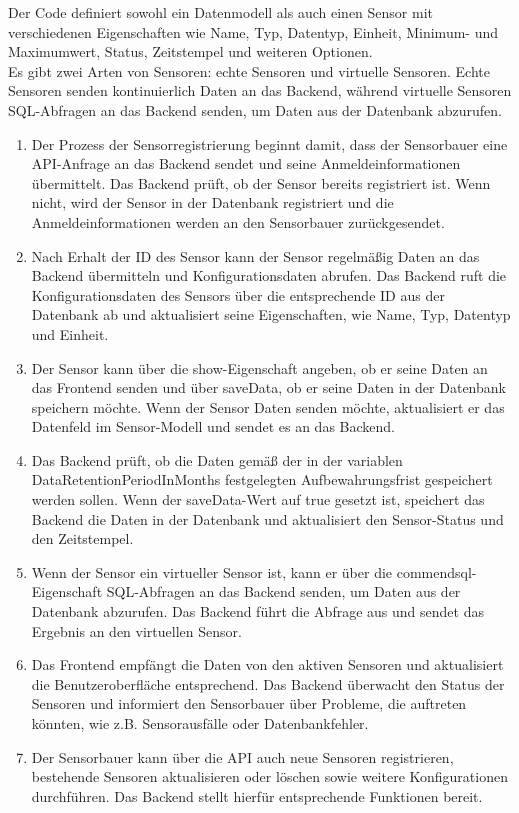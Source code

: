 \begin{flushleft}
Der Code definiert sowohl ein Datenmodell als auch einen Sensor mit verschiedenen Eigenschaften wie Name, Typ, Datentyp, Einheit, Minimum- und Maximumwert, Status, Zeitstempel und weiteren Optionen.\\
Es gibt zwei Arten von Sensoren: echte Sensoren und virtuelle Sensoren. Echte Sensoren senden kontinuierlich Daten an das Backend, während virtuelle Sensoren SQL-Abfragen an das Backend senden, um Daten aus der Datenbank abzurufen.
\\
\begin{enumerate}
	\item Der Prozess der Sensorregistrierung beginnt damit, dass der Sensorbauer eine API-Anfrage an das Backend sendet und seine Anmeldeinformationen übermittelt. Das Backend prüft, ob der Sensor bereits registriert ist. Wenn nicht, wird der Sensor in der Datenbank registriert und die Anmeldeinformationen werden an den Sensorbauer zurückgesendet.
	\item Nach Erhalt der ID des Sensor kann der Sensor regelmäßig Daten an das Backend übermitteln und Konfigurationsdaten abrufen. Das Backend ruft die Konfigurationsdaten des Sensors über die entsprechende ID aus der Datenbank ab und aktualisiert seine Eigenschaften, wie Name, Typ, Datentyp und Einheit.
	\item Der Sensor kann über die show-Eigenschaft angeben, ob er seine Daten an das Frontend senden und über saveData, ob er seine Daten in der Datenbank speichern möchte. Wenn der Sensor Daten senden möchte, aktualisiert er das Datenfeld im Sensor-Modell und sendet es an das Backend.
	\item Das Backend prüft, ob die Daten gemäß der in der variablen DataRetentionPeriodInMonths festgelegten Aufbewahrungsfrist gespeichert werden sollen. Wenn der saveData-Wert auf true gesetzt ist, speichert das Backend die Daten in der Datenbank und aktualisiert den Sensor-Status und den Zeitstempel.
	\item Wenn der Sensor ein virtueller Sensor ist, kann er über die commendsql-Eigenschaft SQL-Abfragen an das Backend senden, um Daten aus der Datenbank abzurufen. Das Backend führt die Abfrage aus und sendet das Ergebnis an den virtuellen Sensor.
	\item Das Frontend empfängt die Daten von den aktiven Sensoren und aktualisiert die Benutzeroberfläche entsprechend. Das Backend überwacht den Status der Sensoren und informiert den Sensorbauer über Probleme, die auftreten könnten, wie z.B. Sensorausfälle oder Datenbankfehler.
	\item Der Sensorbauer kann über die API auch neue Sensoren registrieren, bestehende Sensoren aktualisieren oder löschen sowie weitere Konfigurationen durchführen. Das Backend stellt hierfür entsprechende Funktionen bereit.
\end{enumerate}




\end{flushleft}
